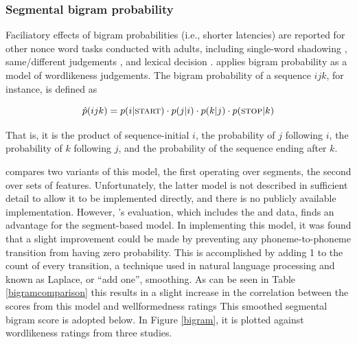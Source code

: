 \subsubsection{Segmental bigram probability}

Faciliatory effects of bigram probabilities (i.e., shorter latencies) are reported for other nonce word tasks conducted with adults, including single-word shadowing \citep{Vitevitch1997,Vitevitch1998}, same/different judgements \citep{Lipinski2005,Luce2001,Vitevitch1999a,Vitevitch2005}, and lexical decision \citep{Pylkkanen2002a}. 
\citet{Albright2009a} applies bigram probability as a model of wordlikeness judgements. 
The bigram probability of a sequence $ijk$, for instance, is defined as 

\begin{equation*}
\displaystyle \hat{p}(ijk) = p(i|\textsc{start}) \cdot p(j|i) \cdot p(k|j) \cdot p(\textsc{stop}|k)
\end{equation*}

\noindent
That is, it is the product of sequence-initial $i$, the probability of $j$ following $i$, the probability of $k$ following $j$, and the probability of the sequence ending after $k$.

\citet{Albright2009a} compares two variants of this model, the first operating over segments, the second over sets of features. 
Unfortunately, the latter model is not described in sufficient detail to allow it to be implemented directly, and there is no publicly available implementation.
However, \citeauthor{Albright2009a}'s evaluation, which includes the \citet{Scholes1966} and \citet{Albright2003b} data, finds an advantage for the segment-based model.
In implementing this model, it was found that a slight improvement could be made by preventing any phoneme-to-phoneme transition from having zero probability. 
This is accomplished by adding 1 to the count of every transition, a technique used in natural language processing and known as Laplace, or ``add one'', smoothing.
As can be seen in Table \ref{bigramcomparison}
this results in a slight increase in the correlation between the scores from this model and wellformedness ratings 
This smoothed segmental bigram score is adopted below.
In Figure \ref{bigram}, it is plotted against wordlikeness ratings from three studies.

